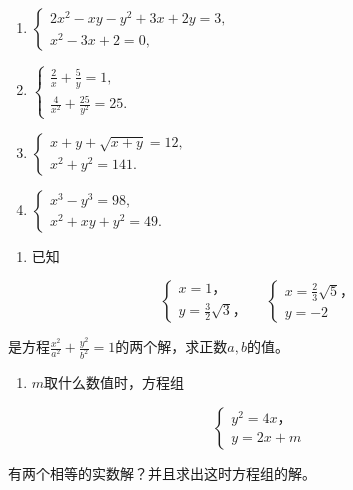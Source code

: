 \begin{enumerate}[start=4]
\item
  \(\left\{ \begin{array}{l} 2x^{2} - xy - y^{2} + 3x + 2y = 3, \\ x^{2} - 3x + 2 = 0, \end{array} \right.\)
\item
  \(\left\{ \begin{array}{l} \frac{2}{x} + \frac{5}{y} = 1, \\ \frac{4}{x^2} + \frac{25}{y^2} = 25. \end{array} \right.\)
\item
  \(\left\{ \begin{array}{l} x + y + \sqrt{x + y} = 12, \\ x^2 + y^2 = 141. \end{array} \right.\)
\item
  \(\left\{ \begin{array}{l} x^{3} - y^{3} = 98, \\ x^{2} + xy + y^{2} = 49. \end{array} \right.\)
\end{enumerate}

\begin{enumerate}[start=8]
\item
  已知
\end{enumerate}

\[
\left\{ \begin{array}{l} x = 1\text{，} \\ y = \frac{3}{2} \sqrt {3}\text{，} \end{array} \right. \quad \left\{ \begin{array}{l} x = \frac{2}{3} \sqrt {5}\text{，} \\ y = - 2 \end{array} \right.
\]

是方程\(\frac{x^2}{a^2} +\frac{y^2}{b^2} = 1\)的两个解，求正数\(a,b\)的值。

\begin{enumerate}[start=9]
\item
  \(m\)取什么数值时，方程组
\end{enumerate}

\[
\left\{ \begin{array}{l} y ^ {2} = 4 x\text{，} \\ y = 2 x + m \end{array} \right.
\]

有两个相等的实数解？并且求出这时方程组的解。

